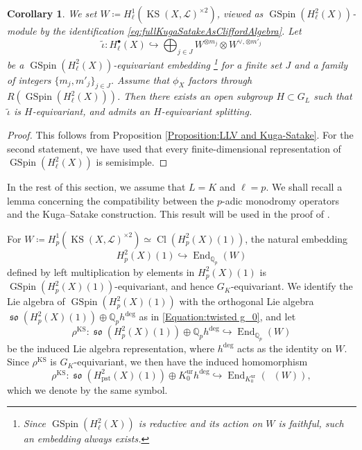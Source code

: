 \documentclass[12pt,reqno]{amsart}
\newtheorem{cor}[thm]{Corollary}
\theoremstyle{definition}
\newcommand{\Q}{{\mathds Q}}
\DeclareMathOperator{\Dpst}{\mathit{D}_{\mathrm{pst}}}
\newcommand\End{\mathop{\mathrm{End}}\nolimits}
\newcommand\Cl{\mathop{\mathrm{Cl}}\nolimits}
\newcommand\so{\mathop{\mathfrak{so}}\nolimits}
\newcommand\GSpin{\mathop{\mathrm{GSpin}}\nolimits}
\newcommand\KS{\mathop{\mathrm{KS}}\nolimits}
\newcommand{\scrL}{\mathscr{L}}
\DeclareMathOperator{\pst}{pst}
\DeclareMathOperator{\ur}{ur}
\numberwithin{equation}{section}
\begin{document}
\begin{cor}\label{Corollary:split Galois equivariant embedding}
    We set $W\coloneqq H^1_{\ell} (\KS(X,\scrL)^{\times 2})$, viewed as $\GSpin(H^2_{\ell}(X))$-module by the identification \eqref{eq:fullKugaSatakeAsCliffordAlgebra}. 
    Let
    \[
\widetilde{\iota} \colon  H^\bullet_\ell(X) \hookrightarrow \bigoplus_{j \in J} W^{\otimes m_j} \otimes W^{\vee, \otimes m'_j}
\]
be a $\GSpin(H^2_{\ell}(X))$-equivariant embedding \footnote{Since $\GSpin(H^2_{\ell}(X))$ is reductive and its action on
$W$
is faithful, such an embedding always exists.}
for a finite set $J$ and a family of integers $\{m_j, m'_j\}_{j \in J}$.
Assume that $\phi_X$ factors through $R(\GSpin(H^2_\ell(X)))$.
Then there exists an open subgroup $H \subset G_L$
such that $\widetilde{\iota}$
is $H$-equivariant, and admits an $H$-equivariant splitting.
\end{cor}

\begin{proof}
This follows from Proposition \ref{Proposition:LLV and Kuga-Satake}.
For the second statement, we have used that
every finite-dimensional representation of $\GSpin(H^2_{\ell}(X))$ is semisimple.
\end{proof}

In the rest of this section, we assume that $L=K$ and $\ell=p$.
We shall recall a lemma concerning the compatibility between the 
$p$-adic monodromy operators and the Kuga--Satake construction.
This result will be used in the proof of .

For $W\coloneqq H^1_{p} (\KS(X,\scrL)^{\times 2}) \simeq \Cl(H^2_{p}(X)(1))$,
the natural embedding
\begin{equation}\label{Equation:Kuga-Satake embedding full cohomology}
    H^2_{p}(X)(1) \hookrightarrow \End_{\Q_p}(W)
\end{equation}
defined by left multiplication by elements in $H^2_{p}(X)(1)$ is
$\GSpin(H^2_{p}(X)(1))$-equivariant, and hence
$G_K$-equivariant.
We identify the Lie algebra of $\GSpin(H^2_{p}(X)(1))$ with the orthogonal Lie algebra
$\so(H^2_{p}(X)(1)) \oplus \Q_ph^{\deg}$
as in \eqref{Equation:twisted g_0}, and 
let
\[
    \rho^{\KS} \colon  \so(H^2_{p}(X)(1)) \oplus \Q_ph^{\deg} \hookrightarrow \End_{\Q_p}(W)
\]
be the induced Lie algebra representation, where $h^{\deg}$ acts as the identity
on
$W$.
Since $\rho^{\KS}$ is $G_K$-equivariant,
we then have the induced homomorphism
\[
\rho^{\KS} \colon \so(H^2_{\pst}(X)(1)) \oplus K^{\ur}_0h^{\deg} \hookrightarrow \End_{K^{\ur}_0}(\Dpst(W)),
\]
which we denote by the same symbol.
\end{document}
